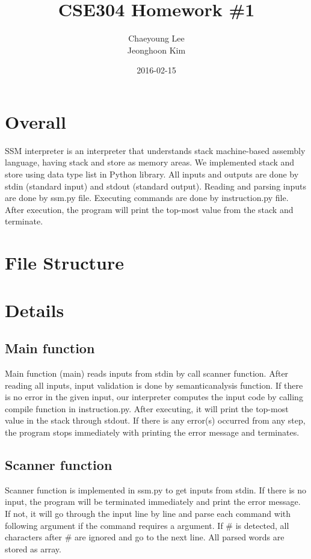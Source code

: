 \documentclass[11pt]{article}
\title{CSE304 Homework \#1}
\author{Chaeyoung Lee\\Jeonghoon Kim}
\date{2016-02-15}
\begin{document}
	
	\maketitle
	\newpage
	
	\section{Overall}
	SSM interpreter is an interpreter that understands stack machine-based assembly language, having stack and store as memory areas. We implemented stack and store using data type list in Python library. All inputs and outputs are done by stdin (standard input) and stdout (standard output). Reading and parsing inputs are done by ssm.py file. Executing commands are done by instruction.py file. After execution, the program will print the top-most value from the stack and terminate.
	\section{File Structure}
	\section{Details}
	\subsection{Main function}
	Main function (main) reads inputs from stdin by call scanner function. After reading all inputs, input validation is done by semanticanalysis function. If there is no error in the given input, our interpreter computes the input code by calling compile function in instruction.py. After executing, it will print the top-most value in the stack through stdout. If there is any error(s) occurred from any step, the program stops immediately with printing the error message and terminates. 
	\subsection{Scanner function}
	Scanner function is implemented in ssm.py to get inputs from stdin. If there is no input, the program will be terminated immediately and print the error message. If not, it will go through the input line by line and parse each command with following argument if the command requires a argument. If \# is detected, all characters after \# are ignored and go to the next line. All parsed words are stored as array. 
\end{document}
